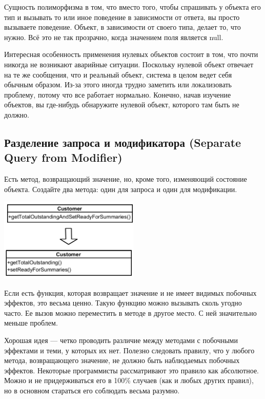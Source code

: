 \documentclass{../../text-style}
\begin{document}
Сущность полиморфизма в том, что вместо того, чтобы спрашивать у объекта его тип и вызывать то или иное поведение в зависимости от ответа, вы просто вызываете поведение. Объект, в зависимости от своего типа, делает то, что нужно. Всё это не так прозрачно, когда значением поля является null. 

Интересная особенность применения нулевых объектов состоит в том, что почти никогда не возникают аварийные ситуации. Поскольку нулевой объект отвечает на те же сообщения, что и реальный объект, система в целом ведет себя обычным образом. Из-за этого иногда трудно заметить или локализовать проблему, потому что все работает нормально. Конечно, начав изучение объектов, вы где-нибудь обнаружите нулевой объект, которого там быть не должно. 

\subsection{Разделение запроса и модификатора (Separate Query from Modifier)}

Есть метод, возвращающий значение, но, кроме того, изменяющий состояние объекта. Создайте два метода: один для запроса и один для модификации.

\begin{center}
    \includegraphics[width=0.5\textwidth]{separateQueryFromModifier.png}
\end{center}

Если есть функция, которая возвращает значение и не имеет видимых побочных эффектов, это весьма ценно. Такую функцию можно вызывать сколь угодно часто. Ее вызов можно переместить в методе в другое место. С ней значительно меньше проблем.

Хорошая идея --- четко проводить различие между методами с побочными эффектами и теми, у которых их нет. Полезно следовать правилу, что у любого метода, возвращающего значение, не должно быть наблюдаемых побочных эффектов. Некоторые программисты рассматривают это правило как абсолютное. Можно и не придерживаться его в 100\% случаев (как и любых других правил), но в основном стараться его соблюдать весьма разумно.
\end{document}
